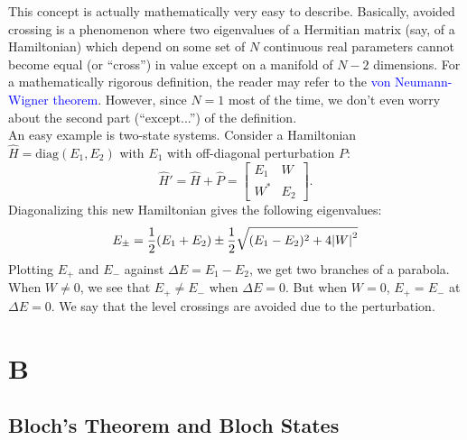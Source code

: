 \documentclass{book}
\theoremstyle{definition}
\newcommand{\f}[2]{\frac{#1}{#2}}
\begin{document}
This concept is actually mathematically very easy to describe. Basically, avoided crossing is a phenomenon where two eigenvalues of a Hermitian matrix (say, of a Hamiltonian) which depend on some set of $N$ continuous real parameters cannot become equal (or ``cross'') in value except on a manifold of $N-2$ dimensions. For a mathematically rigorous definition, the reader may refer to the \textcolor{blue}{von Neumann-Wigner theorem}. However, since $N=1$ most of the time, we don't even worry about the second part (``except...'') of the definition.\\


An easy example is two-state systems. Consider a Hamiltonian $\widehat{H} = \text{diag}(E_1, E_2)$ with $E_1$ with off-diagonal perturbation $P$:
\begin{equation*}
\widehat{H}' = \widehat{H} + \widehat{P} = \begin{bmatrix}
E_1 & W \\ W^* & E_2
\end{bmatrix}.
\end{equation*}
Diagonalizing this new Hamiltonian gives the following eigenvalues:
\begin{equation*}
E_{\pm} = \f{1}{2}(E_1 + E_2) \pm \f{1}{2}\sqrt{(E_1 - E_2)^2 + 4\abs{W}^2}
\end{equation*}
Plotting $E_+$ and $E_-$ against $\Delta E = E_1  - E_2$, we get two branches of a parabola. When $W \neq 0$, we see that $E_+ \neq E_-$ when $\Delta  E = 0$. But when $W = 0$, $E_+ = E_-$ at $\Delta E = 0$. We say that the level crossings are avoided due to the perturbation. 


\chapter*{B}


\section*{Bloch's Theorem and Bloch States}
\end{document}

